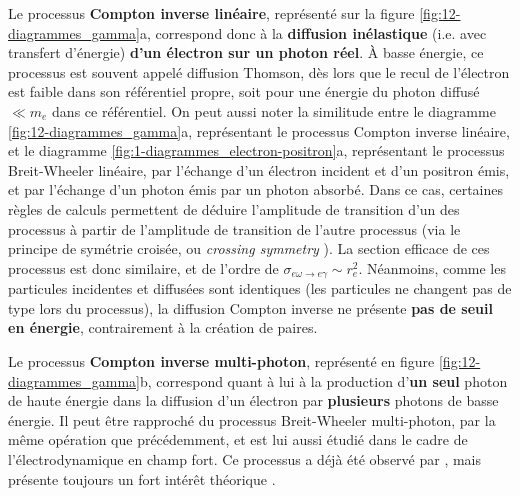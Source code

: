 \begin{refsection}
Le processus \textbf{Compton inverse linéaire}, représenté sur la figure \ref{fig:12-diagrammes_gamma}a, correspond donc à la \textbf{diffusion inélastique} (i.e. avec transfert d'énergie) \textbf{d'un électron sur un photon réel}. À basse énergie, ce processus est souvent appelé diffusion Thomson, dès lors que le recul de l'électron est faible dans son référentiel propre, soit pour une énergie du photon diffusé $\ll m_e$ dans ce référentiel. On peut aussi noter la similitude entre le diagramme \ref{fig:12-diagrammes_gamma}a, représentant le processus Compton inverse linéaire, et le diagramme \ref{fig:1-diagrammes_electron-positron}a, représentant le processus Breit-Wheeler linéaire, par l'échange d'un électron incident et d'un positron émis, et par l'échange d'un photon émis par un photon absorbé. Dans ce cas, certaines règles de calculs permettent de déduire l'amplitude de transition d'un des processus à partir de l'amplitude de transition de l'autre processus (via le principe de symétrie croisée, ou \textit{crossing symmetry} \parencite{greiner_2009}). La section efficace de ces processus est donc similaire, et de l'ordre de \parencite{carron_2007} $\sigma_{e \omega \to e \gamma} \sim r_e^2$. Néanmoins, comme les particules incidentes et diffusées sont identiques (les particules ne changent pas de type lors du processus), la diffusion Compton inverse ne présente \textbf{pas de seuil en énergie}, contrairement à la création de paires.

Le processus \textbf{Compton inverse multi-photon}, représenté en figure \ref{fig:12-diagrammes_gamma}b, correspond quant à lui à la production d'\textbf{un seul} photon de haute énergie dans la diffusion d'un électron par \textbf{plusieurs} photons de basse énergie. Il peut être rapproché du processus Breit-Wheeler multi-photon, par la même opération que précédemment, et est lui aussi étudié dans le cadre de l'électrodynamique en champ fort. Ce processus a déjà été observé par \cite{bula_1996}, mais présente toujours un fort intérêt théorique \parencite{dipiazza_2012}. 


\end{refsection}
